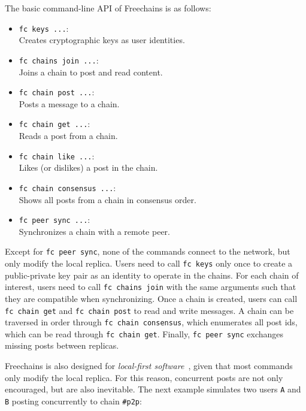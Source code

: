 \documentclass[12pt]{article}
\newcommand{\code}[1]  {\texttt{\footnotesize{#1}}}
\begin{document}
The basic command-line API of Freechains is as follows:

\begin{itemize}
\item \code{fc keys ...}: \\
    Creates cryptographic keys as user identities.
\item \code{fc chains join ...}: \\
    Joins a chain to post and read content.
\item \code{fc chain post ...}: \\
    Posts a message to a chain.
\item \code{fc chain get ...}: \\
    Reads a post from a chain.
\item \code{fc chain like ...}: \\
    Likes (or dislikes) a post in the chain.
\item \code{fc chain consensus ...}: \\
    Shows all posts from a chain in consensus order.
\item \code{fc peer sync ...}: \\
    Synchronizes a chain with a remote peer.
\end{itemize}

Except for \code{fc~peer~sync}, none of the commands connect to the network,
but only modify the local replica.
%
Users need to call \code{fc~keys} only once to create a public-private key pair
as an identity to operate in the chains.
%
For each chain of interest, users need to call \code{fc~chains~join} with the
same arguments such that they are compatible when synchronizing.
%
Once a chain is created, users can call \code{fc~chain~get} and
\code{fc~chain~post} to read and write messages.
%
A chain can be traversed in order through \code{fc~chain~consensus}, which
enumerates all post ids, which can be read through \code{fc~chain~get}.
%
Finally, \code{fc~peer~sync} exchanges missing posts between replicas.

Freechains is also designed for \emph{local-first software}~\cite{p2p.local},
given that most commands only modify the local replica.
For this reason, concurrent posts are not only encouraged, but are also
inevitable.
The next example simulates two users \code{A} and \code{B} posting concurrently
to chain \code{\#p2p}:
\end{document}
